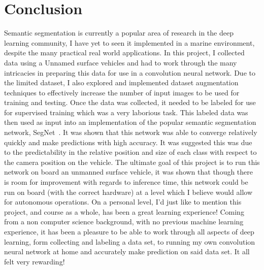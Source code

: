 \documentclass[10pt,twocolumn,letterpaper]{article}
\begin{document}
\section{Conclusion}
Semantic segmentation is currently a popular area of research in the deep learning community, I have yet to seen it implemented in a marine environment, despite the many practical real world applications. In this project, I collected data using a Unnamed surface vehicles and had to work through the many intricacies in preparing this data for use in a convolution neural network. Due to the limited dataset, I also explored and implemented dataset augmentation techniques to effectively increase the number of input images to be used for training and testing. Once the data was collected, it needed to be labeled for use for supervised training which was a very laborious task. This labeled data was then used as input into an implementation of the popular semantic segmentation network, SegNet~\cite{DBLP:journals/corr/BadrinarayananK15}. It was shown that this network was able to converge relatively quickly and make predictions with high accuracy. It was suggested this was due to the predictability in the relative position and size of each class with respect to the camera position on the vehicle. The ultimate goal of this project is to run this network on board an unmanned surface vehicle, it was shown that though there is room for improvement with regards to inference time, this network could be run on board (with the correct hardware) at a level which I believe would allow for autonomous operations.
On a personal level, I'd just like to mention this project, and course as a whole, has been a great learning experience! Coming from a non computer science background, with no previous machine learning experience, it has been a pleasure to be able to work through all aspects of deep learning, form collecting and labeling a data set, to running my own convolution neural network at home and accurately make prediction on said data set. It all felt very rewarding!


{\small


}
\end{document}
